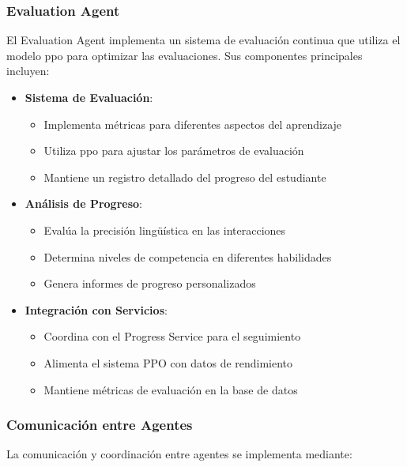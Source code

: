 \subsubsection{Evaluation Agent}

El Evaluation Agent implementa un sistema de evaluación continua que utiliza el modelo \gls{ppo} para optimizar las evaluaciones. Sus componentes principales incluyen:

\begin{itemize}
    \item \textbf{Sistema de Evaluación}:
    \begin{itemize}
        \item Implementa métricas para diferentes aspectos del aprendizaje
        \item Utiliza \gls{ppo} para ajustar los parámetros de evaluación
        \item Mantiene un registro detallado del progreso del estudiante
    \end{itemize}

    \item \textbf{Análisis de Progreso}:
    \begin{itemize}
        \item Evalúa la precisión lingüística en las interacciones
        \item Determina niveles de competencia en diferentes habilidades
        \item Genera informes de progreso personalizados
    \end{itemize}

    \item \textbf{Integración con Servicios}:
    \begin{itemize}
        \item Coordina con el Progress Service para el seguimiento
        \item Alimenta el sistema PPO con datos de rendimiento
        \item Mantiene métricas de evaluación en la base de datos
    \end{itemize}
\end{itemize}

\subsubsection{Comunicación entre Agentes}

La comunicación y coordinación entre agentes se implementa mediante:

